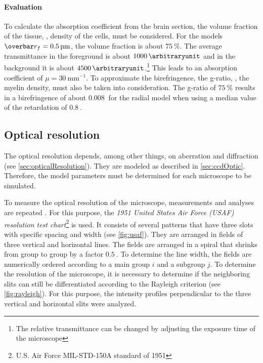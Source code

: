 \paragraph{Evaluation}
To calculate the absorption coefficient from the brain section, the volume fraction of the tissue, \ie{}, density of the cells, must be considered.
For the models $\fiberRadiusMean = \SI{0.5}{\micro\meter}$, the volume fraction is about $\SI{75}{\percent}$.
The average transmittance in the foreground is about $\SI{1000}{\arbitraryunit}$ and in the background it is about $\SI{4500}{\arbitraryunit}$.\footnote{The relative transmittance can be changed by adjusting the exposure time of the microscope}
This leads to an absorption coefficient of $\mu = \SI{30}{\milli\meter\tothe{-1}}$.
To approximate the birefringence, the g-ratio, \ie{}, the myelin density, must also be taken into consideration.
The g-ratio of $\SI{75}{\percent}$ results in a birefringence of about $\SI{0.008}{}$ for the radial model when using a median value of the retardation of $\SI{0.8}{}$.
%
%
%
\subsection{Optical resolution}
%
The optical resolution depends, among other things, on aberration and diffraction (see \cref{sec:opticalResolution}).
They are modeled as described in \cref{sec:ccdOptic}.
Therefore, the model parameters must be determined for each microscope to be simulated.
\par
%
To measure the optical resolution of the microscope, measurements and analyses are repeated \cite{MenzelMaster}.
For this purpose, the \textit{1951 United States Air Force (USAF) resolution test chart}\footnote{U.S. Air Force MIL-STD-150A standard of 1951} is used.
It consists of several patterns that have three slots with specific spacing and width (see \cref{fig:usaf}).
They are arranged in fields of three vertical and horizontal lines.
The fields are arranged in a spiral that shrinks from group to group by a factor $\SI{0.5}{}$.
To determine the line width, the fields are numerically ordered according to a main group $i$ and a subgroup $j$.
To determine the resolution of the microscope, it is necessary to determine if the neighboring slits can still be differentiated according to the Rayleigh criterion (see \cref{fig:rayleigh}).
For this purpose, the intensity profiles perpendicular to the three vertical and horizontal slits were analyzed.
%
%
%
